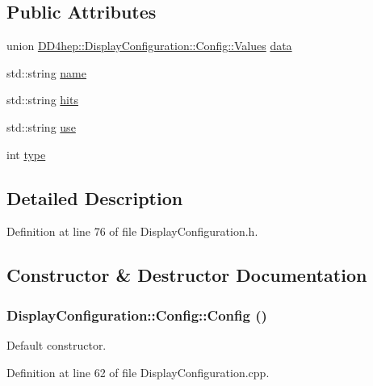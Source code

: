 \subsection*{Public Attributes}
\begin{DoxyCompactItemize}
\item 
union \hyperlink{union_d_d4hep_1_1_display_configuration_1_1_config_1_1_values}{DD4hep::DisplayConfiguration::Config::Values} \hyperlink{class_d_d4hep_1_1_display_configuration_1_1_config_aae403badb7228f69c1f7fecb726e6a99}{data}
\item 
std::string \hyperlink{class_d_d4hep_1_1_display_configuration_1_1_config_adefaa09fe7cde3bb7330de97cf07a1ba}{name}
\item 
std::string \hyperlink{class_d_d4hep_1_1_display_configuration_1_1_config_af16ac4baf6e5e53a8ee3c971f74a5686}{hits}
\item 
std::string \hyperlink{class_d_d4hep_1_1_display_configuration_1_1_config_a2b092695528d45417dfeeb376993d5cb}{use}
\item 
int \hyperlink{class_d_d4hep_1_1_display_configuration_1_1_config_a39e4104003d0a6fe90053120cc97fd60}{type}
\end{DoxyCompactItemize}


\subsection{Detailed Description}


Definition at line 76 of file DisplayConfiguration.h.

\subsection{Constructor \& Destructor Documentation}
\hypertarget{class_d_d4hep_1_1_display_configuration_1_1_config_ae8da46c00b3e85bc7c2a247175216bbc}{
\subsubsection[{Config}]{\setlength{\rightskip}{0pt plus 5cm}DisplayConfiguration::Config::Config ()}}
\label{class_d_d4hep_1_1_display_configuration_1_1_config_ae8da46c00b3e85bc7c2a247175216bbc}


Default constructor. 

Definition at line 62 of file DisplayConfiguration.cpp.


